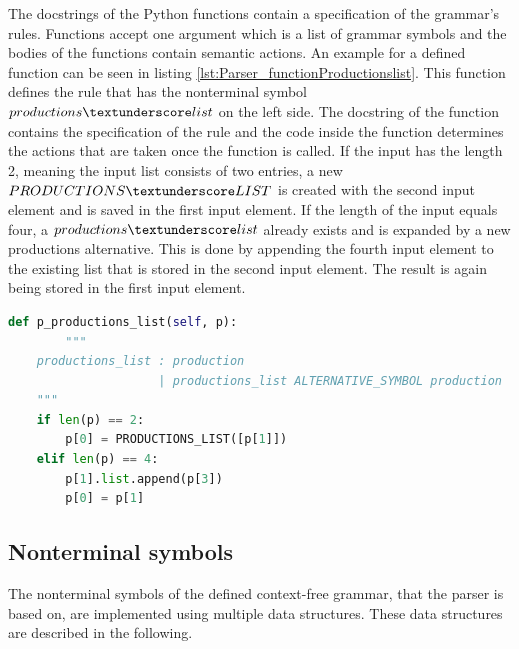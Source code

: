 The docstrings of the Python functions contain a specification of the grammar's rules.
Functions accept one argument which is a list of grammar symbols and the bodies of the functions contain semantic actions.
An example for a defined function can be seen in listing \ref{lst:Parser_functionProductionslist}.
This function defines the rule that has the nonterminal symbol $productions\textunderscore list$ on the left side.
The docstring of the function contains the specification of the rule and the code inside the function determines the actions that are taken once the function is called.
If the input has the length 2, meaning the input list consists of two entries, a new $PRODUCTIONS\textunderscore LIST$ is created with the second input element and is saved in the first input element.
If the length of the input equals four, a $productions\textunderscore list$ already exists and is expanded by a new productions alternative.
This is done by appending the fourth input element to the existing list that is stored in the second input element.
The result is again being stored in the first input element.\\

\begin{lstlisting}[language=Python, basicstyle=\scriptsize, caption= Productions list parser function, label= lst:Parser_functionProductionslist]
def p_productions_list(self, p):
		"""
    productions_list : production
                     | productions_list ALTERNATIVE_SYMBOL production
    """
    if len(p) == 2:
    	p[0] = PRODUCTIONS_LIST([p[1]])
    elif len(p) == 4:
        p[1].list.append(p[3])
        p[0] = p[1]
\end{lstlisting}


\subsection{Nonterminal symbols}\label{sec:ImplementationParserDataStructure}

The nonterminal symbols of the defined context-free grammar, that the parser is based on, are implemented using multiple data structures. These data structures are described in the following.

